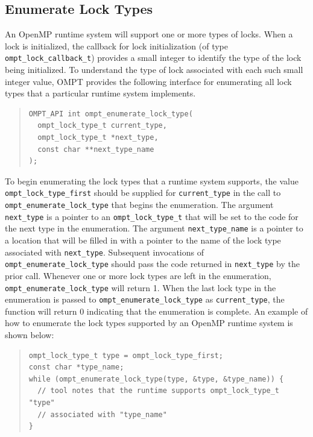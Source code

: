 \documentclass{article}
\begin{document}
 \subsection{Enumerate Lock Types}
 \label{ompt_enumerate_lock_type}
 
An OpenMP runtime system will support one or more types of locks. 
When a lock is initialized, the callback for lock initialization (of type \verb|ompt_lock_callback_t|) provides
a small integer to identify the type of the lock being initialized. 
To understand the type of lock associated with each such small integer value, OMPT provides
the following interface for enumerating all lock types that a particular runtime system implements. 

\begin{quote}
\begin{verbatim}
OMPT_API int ompt_enumerate_lock_type(
  ompt_lock_type_t current_type, 
  ompt_lock_type_t *next_type, 
  const char **next_type_name
);
\end{verbatim}
\end{quote}

\noindent
To begin enumerating the lock types that a runtime system supports,
the value \verb|ompt_lock_type_first| should be supplied for \verb|current_type| in the call to \verb|ompt_enumerate_lock_type| that begins the enumeration.
The argument \verb|next_type| is a pointer to an \verb|ompt_lock_type_t| that will be set to the code for the next type in the enumeration.
The argument \verb|next_type_name| is a pointer to a location that will be filled in with a pointer to the name of the lock type associated with \verb|next_type|. 
Subsequent invocations of \verb|ompt_enumerate_lock_type| should pass the code returned in \verb|next_type| by the prior call.
Whenever one or more lock types are left in the enumeration, \verb|ompt_enumerate_lock_type| will return 1.
When the last lock type in the enumeration is passed to \verb|ompt_enumerate_lock_type| as \verb|current_type|, 
the function will return 0 indicating that the enumeration is complete.
An example of how to enumerate the lock types supported by an OpenMP runtime system is shown below:

\begin{quote}
\begin{verbatim}
ompt_lock_type_t type = ompt_lock_type_first;
const char *type_name;
while (ompt_enumerate_lock_type(type, &type, &type_name)) {
  // tool notes that the runtime supports ompt_lock_type_t "type" 
  // associated with "type_name" 
}
\end{verbatim}
\end{quote}
\end{document}
